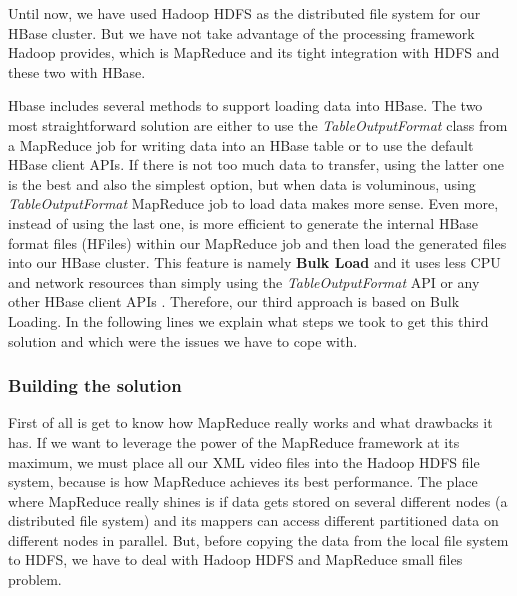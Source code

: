 Until now, we have used Hadoop HDFS as the distributed file system for our HBase cluster. But we have not take advantage of the processing framework Hadoop provides, which is MapReduce and its tight integration with HDFS and these two with HBase.
\par
Hbase includes several methods to support loading data into HBase. The two most straightforward solution are either to use the \textit{TableOutputFormat} class from a MapReduce job for writing data into an HBase table or to use the default HBase client APIs. If there is not too much data to transfer, using the latter one is the best and also the simplest option, but when data is voluminous, using \textit{TableOutputFormat} MapReduce job to load data makes more sense. Even more, instead of using the last one, is more efficient to generate the internal HBase format files (HFiles) within our MapReduce job and then load the generated files into our HBase cluster. This feature is namely \textbf{Bulk Load} and it uses less CPU and network resources than simply using the \textit{TableOutputFormat} API or any other HBase client APIs \cite{ApacheHBaseBulkLoad}. Therefore, our third approach is based on Bulk Loading. In the following lines we explain what steps we took to get this third solution and which were the issues we have to cope with.

\subsubsection{Building the solution}

First of all is get to know how MapReduce really works and what drawbacks it has. If we want to leverage the power of the MapReduce framework at its maximum, we must place all our XML video files into the Hadoop HDFS file system, because is how MapReduce achieves its best performance. The place where MapReduce really shines is if data gets stored on several different nodes (a distributed file system) and its mappers can access different partitioned data on different nodes in parallel. But, before copying the data from the local file system to HDFS, we have to deal with Hadoop HDFS and MapReduce small files problem.

